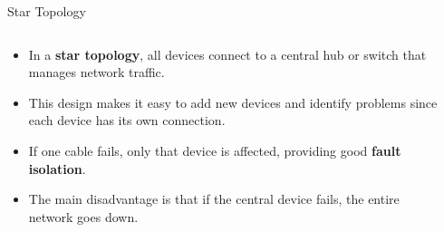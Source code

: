 \documentclass[aspectratio=169]{beamer}
\newcommand{\neticon}[2][0.4cm]{\texttt{[image: \#2]}}
\begin{document}
\begin{frame}{Star Topology}

\begin{columns}
\begin{column}{0.5\textwidth}
\begin{itemize}
    \item In a \textbf{star topology}, all devices connect to a central hub or switch that manages network traffic.
    \item This design makes it easy to add new devices and identify problems since each device has its own connection.
    \item If one cable fails, only that device is affected, providing good \textbf{fault isolation}.
    \item The main disadvantage is that if the central device fails, the entire network goes down.
\end{itemize}
\end{column}

\begin{column}{0.45\textwidth}
\centering
{}
\end{column}
\end{columns}

\end{frame}
\end{document}
